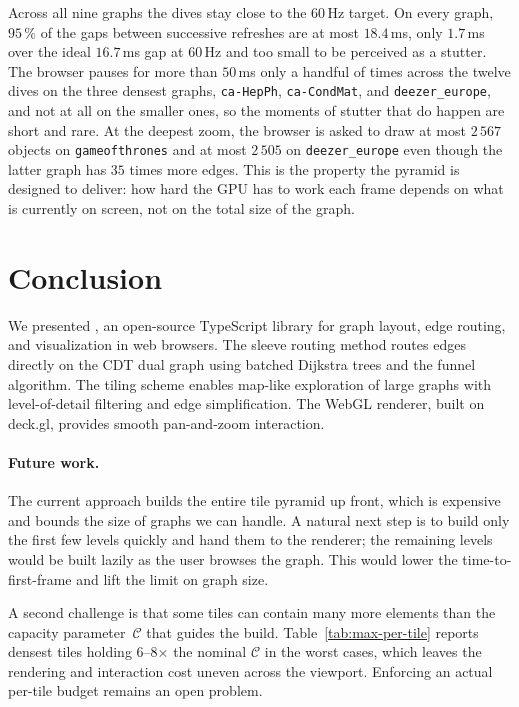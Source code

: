 Across all nine graphs the dives stay close to the $60$\,Hz target.
On every graph, $95\,\%$ of the gaps between successive refreshes
are at most $18.4$\,ms, only $1.7$\,ms over the ideal $16.7$\,ms gap
at $60$\,Hz and too small to be perceived as a stutter. The
browser pauses for more than $50$\,ms only a handful of times across
the twelve dives on the three densest graphs, \texttt{ca-HepPh},
\texttt{ca-CondMat}, and \texttt{deezer\_europe}, and not at all on
the smaller ones, so the moments of stutter that do happen are short
and rare. At the deepest zoom, the browser is asked to draw at most
$2\,567$ objects on \texttt{gameofthrones} and at most $2\,505$ on
\texttt{deezer\_europe} even though the latter graph has $35$ times
more edges. This is the property the pyramid is designed to deliver:
how hard the GPU has to work each frame depends on what is currently
on screen, not on the total size of the graph.

\section{Conclusion}
\label{sec:conclusion}

We presented \msagljs{}, an open-source TypeScript library for graph layout, edge routing, and visualization in web browsers. The sleeve routing method routes edges directly on the CDT dual graph using batched Dijkstra trees and the funnel algorithm. The tiling scheme enables map-like exploration of large graphs with level-of-detail filtering and edge simplification. The WebGL renderer, built on deck.gl, provides smooth pan-and-zoom interaction.

\paragraph{Future work.} The current approach builds the entire tile
pyramid up front, which is expensive and bounds the size of graphs we
can handle. A natural next step is to build only the first few levels
quickly and hand them to the renderer; the remaining levels would be
built lazily as the user browses the graph. This
would lower the time-to-first-frame and lift the limit on graph size.

A second challenge is that some tiles can contain many more
elements than the capacity parameter~$\mathcal{C}$ that guides the
build. Table~\ref{tab:max-per-tile} reports densest tiles holding
6--8$\times$ the nominal $\mathcal{C}$ in the worst cases, which leaves
the rendering and interaction cost uneven across the viewport.
Enforcing an actual per-tile budget remains an open problem.




